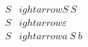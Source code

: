 \begin{align*}S &
ightarrow S\ S \\
S &
ightarrow \varepsilon \\
S &
ightarrow a\ S\ b \\
\end{align*}